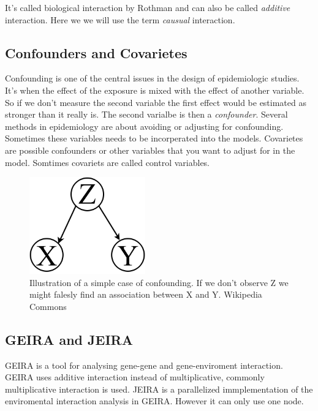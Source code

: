 \documentclass[10pt,a4paper]{article}
\begin{document}
It's called biological interaction by Rothman\cite{} and can also be called \emph{additive} interaction\cite{geira}. Here we we will use the term \emph{causual} interaction.\\


\subsection{Confounders and Covarietes}
Confounding is one of the central issues in the design of epidemiologic studies. It's when the effect of the exposure is mixed with the effect of another variable. So if we don't measure the second variable the first effect would be estimated as stronger than it really is. The second varialbe is then a \emph{confounder}. Several methods in epidemiology are about avoiding or adjusting for confounding. Sometimes these variables needs to be incorperated into the models. Covarietes are possible confounders or other variables that you want to adjust for in the model. Somtimes covariets are called control variables.\cite{rothman2002intro_epidemiology,rothman1998modern}

\begin{figure}[h]
    \centering
    \includegraphics[width=5cm]{Simple_Confounding_Case.png}
    \caption{Illustration of a simple case of confounding. If we don't observe Z we might falesly find an association between X and Y. Wikipedia Commons}
    \label{fig:confunding}
\end{figure}

\subsection{GEIRA and JEIRA}
GEIRA is a tool for analysing gene-gene and gene-enviroment interaction. GEIRA uses additive interaction instead of multiplicative, commonly multiplicative interaction is used\cite{geira}. JEIRA is a parallelized immplementation of the enviromental interaction analysis in GEIRA. However it can only use one node.
\end{document}
